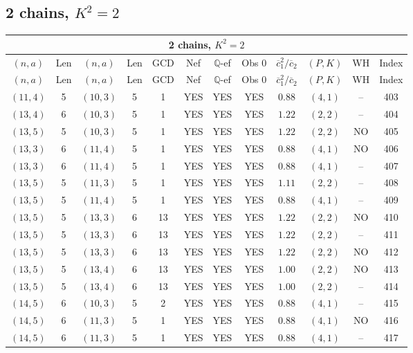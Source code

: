 \subsection{2 chains, $K^2 = 2$}
\begin{longtable}{|c|c|c|c|c|c|c|c|c|c|c|c|}
\hline
\multicolumn{12}{|c|}{2 chains, $K^2 = 2$}\\
\hline
$(n,a)$ & Len & $(n,a)$ & Len & GCD & Nef & $\mathbb Q$-ef & Obs 0 & $\overline c_1^2 / \overline c_2$ & $(P,K)$ & WH & Index\\
\hline
\endfirsthead

\hline
$(n,a)$ & Len & $(n,a)$ & Len & GCD & Nef & $\mathbb Q$-ef & Obs 0 & $\overline c_1^2 / \overline c_2$ & $(P,K)$ & WH & Index\\
\hline
\endhead
\hline
\endfoot

$(11,4)$ & 5 & $(10,3)$ & 5 & 1 & YES & YES & YES & $0.88$ & $(4,1)$ & -- & 403\\
$(13,4)$ & 6 & $(10,3)$ & 5 & 1 & YES & YES & YES & $1.22$ & $(2,2)$ & -- & 404\\
$(13,5)$ & 5 & $(10,3)$ & 5 & 1 & YES & YES & YES & $1.22$ & $(2,2)$ & NO & 405\\
$(13,3)$ & 6 & $(11,4)$ & 5 & 1 & YES & YES & YES & $0.88$ & $(4,1)$ & NO & 406\\
$(13,3)$ & 6 & $(11,4)$ & 5 & 1 & YES & YES & YES & $0.88$ & $(4,1)$ & -- & 407\\
$(13,5)$ & 5 & $(11,3)$ & 5 & 1 & YES & YES & YES & $1.11$ & $(2,2)$ & -- & 408\\
$(13,5)$ & 5 & $(11,4)$ & 5 & 1 & YES & YES & YES & $0.88$ & $(4,1)$ & -- & 409\\
$(13,5)$ & 5 & $(13,3)$ & 6 & 13 & YES & YES & YES & $1.22$ & $(2,2)$ & NO & 410\\
$(13,5)$ & 5 & $(13,3)$ & 6 & 13 & YES & YES & YES & $1.22$ & $(2,2)$ & -- & 411\\
$(13,5)$ & 5 & $(13,3)$ & 6 & 13 & YES & YES & YES & $1.22$ & $(2,2)$ & NO & 412\\
$(13,5)$ & 5 & $(13,4)$ & 6 & 13 & YES & YES & YES & $1.00$ & $(2,2)$ & NO & 413\\
$(13,5)$ & 5 & $(13,4)$ & 6 & 13 & YES & YES & YES & $1.00$ & $(2,2)$ & -- & 414\\
$(14,5)$ & 6 & $(10,3)$ & 5 & 2 & YES & YES & YES & $0.88$ & $(4,1)$ & -- & 415\\
$(14,5)$ & 6 & $(11,3)$ & 5 & 1 & YES & YES & YES & $0.88$ & $(4,1)$ & NO & 416\\
$(14,5)$ & 6 & $(11,3)$ & 5 & 1 & YES & YES & YES & $0.88$ & $(4,1)$ & -- & 417\\

\end{longtable}
